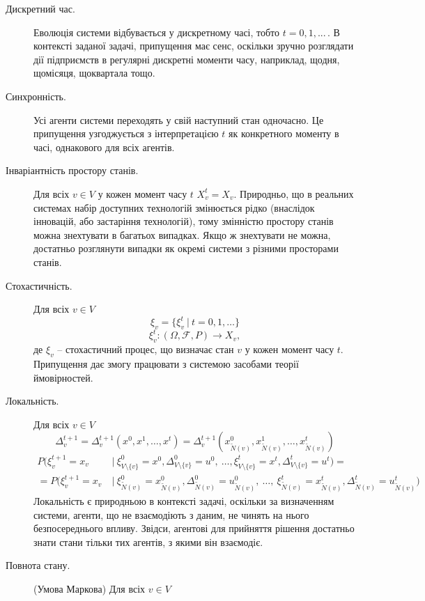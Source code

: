\documentclass[oneside,draft,14pt]{extarticle}
\begin{document}
\begin{description} 
    \item[Дискретний час.] Еволюція системи відбувається у дискретному часі, тобто \(t = 0, 1, ...\,\). В контексті заданої задачі, припущення має сенс, оскільки зручно розглядати дії підприємств в регулярні дискретні моменти часу, наприклад, щодня, щомісяця, щоквартала тощо.
    \item[Синхронність.] Усі агенти системи переходять у свій наступний стан одночасно. Це припущення узгоджується з інтерпретацією \(t\) як конкретного моменту в часі, однакового для всіх агентів.
    \item[Інваріантність простору станів.] Для всіх \(v \in V\) у кожен момент часу \(t\) \(X_v^t = X_v\). Природньо, що в реальних системах набір доступних технологій змінюється рідко (внаслідок інновацій, або застаріння технологій), тому змінністю простору станів можна знехтувати в багатьох випадках. Якщо ж знехтувати не можна, достатньо розглянути випадки як окремі системи з різними просторами станів.
    \item[Стохастичність.] Для всіх \(v \in V\)
    \[ \xi_v = \{\xi^t_v\ |\ t = 0, 1, \ldots \}\] \[ \xi_v^t : (\Omega, \mathcal{F}, P) \rightarrow X_v,\]
    де \( \xi_v \) – стохастичний процес, що визначає стан \(v\) у кожен момент часу \(t\). Припущення дає змогу працювати з системою засобами теорії ймовірностей.
    \item[Локальність.] Для всіх \(v \in V\) 
    \[\Delta_v^{t+1} = \Delta_v^{t+1}(x^0, x^1, \ldots, x^t) = \Delta_v^{t+1}(x_{\tilde{N}(v)}^0, x_{\tilde{N}(v)}^1, \ldots, x_{\tilde{N}(v)}^t)\]
    \begin{align*}
    P(\xi_v^{t+1} = x_v\ &|\ \xi_{V\setminus\{v\}}^0 = x^0, \Delta_{V\setminus\{v\}}^0 = u^0,\ \ldots, \xi_{V\setminus\{v\}}^t = x^t, \Delta_{V\setminus\{v\}}^t = u^t) = \\
	= P(\xi_v^{t+1} = x_v\ &|\ \xi_{\tilde N(v)}^0 = x_{\tilde N(v)}^0, \Delta_{\tilde N(v)}^0 = u_{\tilde N(v)}^0,\ \ldots,\ \xi_{\tilde N(v)}^t = x_{\tilde N(v)}^t, \Delta_{\tilde N(v)}^t = u_{\tilde N(v)}^t)
	\end{align*}
	Локальність є природньою в контексті задачі, оскільки за визначенням системи, агенти, що не взаємодіють з даним, не чинять на нього безпосереднього впливу. Звідси, агентові для прийняття рішення достатньо знати стани тільки тих агентів, з якими він взаємодіє.
	\item[Повнота стану.] (Умова Маркова) Для всіх \(v \in V\)

\end{description}
\end{document}
